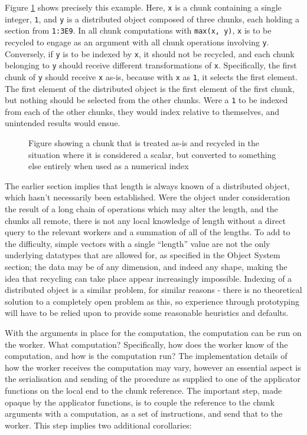 Figure \cref{fig:chunk-recycle} shows precisely this example. Here, \texttt{x} is a
chunk containing a single integer, \texttt{1}, and \texttt{y} is a
distributed object composed of three chunks, each holding a section from
\texttt{1:3E9}. In all chunk computations with \texttt{max(x,\ y)},
\texttt{x} is to be recycled to engage as an argument with all chunk
operations involving \texttt{y}. Conversely, if \texttt{y} is to be
indexed by \texttt{x}, it should not be recycled, and each chunk
belonging to \texttt{y} should receive different transformations of
\texttt{x}. Specifically, the first chunk of \texttt{y} should receive
\texttt{x} as-is, because with \texttt{x} as \texttt{1}, it selects the
first element. The first element of the distributed object is the first
element of the first chunk, but nothing should be selected from the
other chunks. Were a \texttt{1} to be indexed from each of the other
chunks, they would index relative to themselves, and unintended results
would ensue.

\begin{figure}[ht]
    \centering
    
    \caption{Figure showing a chunk that is treated as-is and recycled in
        the situation where it is considered a scalar, but converted to
        something else entirely when used as a numerical index}
    \label{fig:chunk-recycle}
\end{figure}

The earlier section implies that length is always known of a distributed
object, which hasn't necessarily been established. Were the object under
consideration the result of a long chain of operations which may alter
the length, and the chunks all remote, there is not any local knowledge
of length without a direct query to the relevant workers and a summation
of all of the lengths. To add to the difficulty, simple vectors with a
single ``length'' value are not the only underlying datatypes that are
allowed for, as specified in the Object System section; the data may be
of any dimension, and indeed any shape, making the idea that recycling
can take place appear increasingly impossible. Indexing of a distributed
object is a similar problem, for similar reasons - there is no
theoretical solution to a completely open problem as this, so experience
through prototyping will have to be relied upon to provide some
reasonable heuristics and defaults.

With the arguments in place for the computation, the computation can be
run on the worker. What computation? Specifically, how does the worker
know of the computation, and how is the computation run? The
implementation details of how the worker receives the computation may
vary, however an essential aspect is the serialisation and sending of
the procedure as supplied to one of the applicator functions on the
local end to the chunk reference. The important step, made opaque by the
applicator functions, is to couple the reference to the chunk arguments
with a computation, as a set of instructions, and send that to the
worker. This step implies two additional corollaries:

